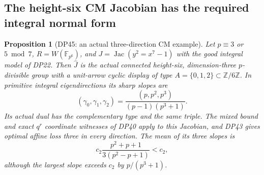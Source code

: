 \documentclass[11pt,a4paper]{article}
\newtheorem{proposition}[theorem]{Proposition}
\theoremstyle{definition}\newtheorem{remark}[theorem]{Remark}
\newcommand{\Z}{\mathbb Z}\newcommand{\Q}{\mathbb Q}\newcommand{\F}{\mathbb F}
\begin{document}
\subsection{The height-six CM Jacobian has the required integral normal form}

\begin{proposition}[DP45: an actual three-direction CM example]\label{DP45}
Let $p\equiv3$ or $5\bmod7$, $R=W(\F_{p^6})$, and
$J=\operatorname{Jac}(y^2=x^7-1)$ with the good integral model of DP22.
Then $\widehat J$ is the actual connected height-six, dimension-three
$p$-divisible group with a unit-arrow cyclic display of type
$A=\{0,1,2\}\subset\Z/6\Z$.
In primitive integral eigendirections its sharp slopes are
\[
 (\gamma_0,\gamma_1,\gamma_2)
       =\frac{(p,p^2,p^3)}{(p-1)(p^3+1)}.
\]
Its actual dual has the complementary type and the same triple.
The mixed bound and exact $q^r$ coordinate witnesses of DP40 apply to this Jacobian, and DP43 gives optimal affine loss three in every direction.
The mean of its three slopes is
\[
 c_2\frac{p^2+p+1}{3(p^2-p+1)}<c_2,
\]
although the largest slope exceeds $c_2$ by $p/(p^3+1)$.
\end{proposition}
\end{document}
